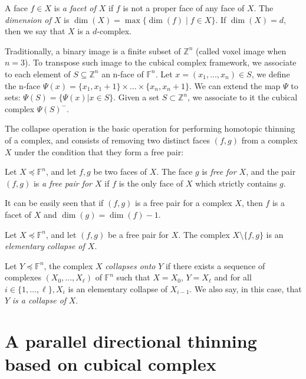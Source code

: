 \documentclass[final,envcountsame]{llncs}
\def\myem#1{{\em #1}}
\def\V2C{\Psi}
\def\Zset{\Z}
\def\Z{\mathbb{Z}}
\def\allfaces#1{\mathbb{F}^{#1}}
\def\subcomplex#1#2{#1 \preceq #2}
\def\complex#1#2{\subcomplex{#2}{\allfaces{#1}}}
\def\closure#1{#1^-}
\def\mydim#1{\dim(#1)}
\def\suchthat{\;|\;}
\def\dinterval#1#2{\{#1,\ldots,#2\}}
\begin{document}
A face $f \in X$ is \myem{a facet of $X$} if $f$ is not a proper face of any face of $X$. The \myem{dimension of $X$} is $\mydim{X} = \max\{\mydim{f} \suchthat f \in X\}$. If $\mydim{X} = d$, then we say that $X$ is a $d$-complex.

Traditionally, a binary image is a finite subset of $\Zset^n$ (called voxel image when $n=3$). To transpose such image to the cubical complex framework, we associate to each element of $S\subseteq \Zset^n$ an n-face of $\allfaces{n}$. Let $x=(x_1,...,x_n) \in S$, we define the n-face $\V2C(x) = \{x_1, x_1 + 1\} \times \ldots \times \{x_n, x_n + 1\}$. We can extend the map $\V2C$ to sets: $\V2C(S)=\{\V2C(x) | x \in S\}$. Given a set $S \subset \Zset^n$, we associate to it the cubical complex $\closure{\V2C(S)}$.

The collapse operation is the basic operation for performing homotopic thinning of a complex, and consists of removing two distinct faces $(f,g)$ from a complex $X$ under the condition that they form a free pair:

\begin{definition}
Let $\complex{n}{X}$, and let $f,g$ be two faces of $X$. The face $g$ is \myem{free for $X$}, and the pair $(f,g)$ is \myem{a free pair for $X$} if $f$ is the only face of $X$ which strictly contains $g$. 
\end{definition}

It can be easily seen that if $(f,g)$ is a free pair for a complex $X$, then $f$ is a facet of $X$ and $\dim(g) = \dim(f)-1$.

\begin{definition}
Let $\complex{n}{X}$, and let $(f,g)$ be a free pair for $X$. The complex $X \setminus \{f,g\}$ is an \myem{elementary collapse of $X$}.

Let $\complex{n}{Y}$, the complex $X$ \myem{collapses onto} $Y$ if there exists a sequence of complexes $(X_0,...,X_\ell)$ of $\allfaces{n}$ such that $X=X_0$, $Y=X_\ell$ and for all $i \in \dinterval{1}{\ell}, X_{i}$ is an elementary collapse of $X_{i-1}$. We also say, in this case, that $Y$ \myem{is a collapse of} $X$.
\end{definition}

\section{A parallel directional thinning based on cubical complex}
\label{sec::skeletonization}
\end{document}

